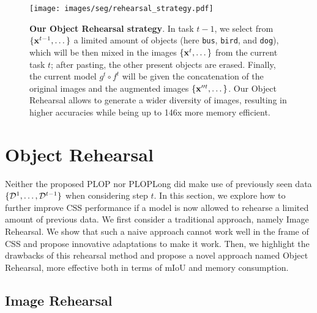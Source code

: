 \begin{figure}[ht!]
    \centering
    \texttt{[image: images/seg/rehearsal\_strategy.pdf]}
    \caption{\textbf{Our Object Rehearsal strategy}. In task $t-1$, we select from $\{\mathbf{x}^{t-1},
            \dots \}$ a limited amount of objects (here \texttt{bus}, \texttt{bird}, and
        \texttt{dog}), which will be then mixed in the images $\{\mathbf{x}^{t}, \dots \}$ from the
        current task $t$; after pasting, the other present objects are erased. Finally, the
        current model $g^t \circ f^t$ will be given the concatenation of the original images and
        the augmented images $\{\mathbf{x}''^t, \dots\}$. Our Object Rehearsal allows to generate a
        wider diversity of images, resulting in higher accuracies while being up to 146x more
        memory efficient.}
    \label{fig:seg_model_objectrehearsal}
\end{figure}


\section{Object Rehearsal}
\label{sec:seg_rehearsal}

Neither the proposed PLOP nor PLOPLong did make use of previously seen data $\{\mathcal{D}^{1}, \dots,
    \mathcal{D}^{t-1}\}$ when considering step $t$. In this section, we explore how to further improve
\ac{CSS} performance if a model is now allowed to rehearse a limited amount of previous data. We
first consider a traditional approach, namely Image Rehearsal. We show that such a naive
approach cannot work well in the frame of \ac{CSS} and propose innovative adaptations to make it
work. Then, we highlight the drawbacks of this rehearsal method and propose a novel approach
named Object Rehearsal, more effective both in terms of \ac{mIoU} and memory consumption.

\subsection{Image Rehearsal}
\label{sec:seg_image_rehearsal}

